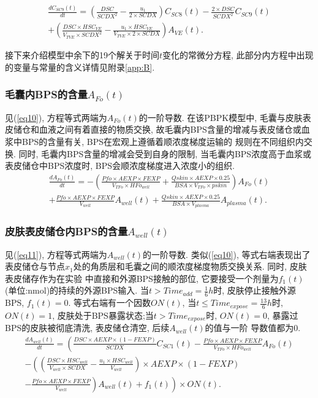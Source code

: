 \documentclass[a4paper,punct=banjiao,twoside]{ctexrep}
\theoremstyle{plain}
\theoremstyle{definition}
\theoremstyle{remark}
\begin{document}
\begin{multline}\label{eq3}
  \frac{dC_{SC9}(t)}{dt}=\left(\frac{DSC}{SCDX^2} -\frac{u_1}{2 \times  SCDX}\right)C_{SC8}(t)-\frac{2 \times DSC}{SCDX^2}  C_{SC9}(t)\\
  +\left(\frac{DSC \times  HSC_{VE}}{V_{TVE}  \times  SCDX^2 }-\frac{u_1  \times  HSC_{VE}}{V_{TVE}  \times  2 \times  SCDX}\right)A_{VE}(t) .
\end{multline}

接下来介绍模型中余下的19个解关于时间$t$变化的常微分方程, 此部分内方程中出现的变量与常量的含义详情见附录\ref{app:B}.
\subsubsection*{毛囊内BPS的含量$A_{Fo}(t)$}
见(\ref{eq10}), 方程等式两端为$A_{Fo}(t)$的一阶导数. 在该PBPK模型中, 毛囊与皮肤表皮储仓和血液之间有着直接的物质交换, 故毛囊内BPS含量的增减与表皮储仓或血浆中BPS的含量有关, BPS在宏观上遵循着顺浓度梯度运输的
规则在不同组织内交换. 同时, 毛囊内BPS含量的增减会受到自身的限制, 当毛囊内BPS浓度高于血浆或表皮储仓中BPS浓度时, BPS会顺浓度梯度进入浓度小的组织.
\begin{multline}\label{eq10}
  \frac{dA_{Fo}(t)}{dt} = -\left(\frac{Pfo \times  AEXP \times  FEXP}{V_{TFo}  \times  HFo_{well} }
  +\frac{Qskin \times  AEXP \times  0.25}{BSA \times  V_{TFo}  \times  pskin}\right)A_{Fo}(t)\\
  +\frac{Pfo \times  AEXP \times  FEXP}{V_{well}  }A_{well}(t)+\frac{Qskin \times  AEXP \times  0.25}{BSA \times  V_{plasma}} A_{plasma}(t).
\end{multline}

\subsubsection*{皮肤表皮储仓内BPS的含量$A_{well}(t)$}
见(\ref{eq11}), 方程等式两端为$A_{well}(t)$的一阶导数. 类似(\ref{eq10}), 等式右端表现出了表皮储仓与节点$x_1$处的角质层和毛囊之间的顺浓度梯度物质交换关系. 同时, 皮肤表皮储存作为在实验
中直接和外源BPS接触的部位, 它要接受一个剂量为$f_1 (t)$(单位:nmol)的持续的外源BPS输入. 当$t>Time_{add}=\frac{1}{6}h$时, 皮肤停止接触外源BPS, $f_1 (t)=0$. 
等式右端有一个因数$ON(t)$, 当$t\leq Time_{expose}=\frac{13}{6}h$时, $ON(t)=1$, 皮肤处于BPS暴露状态;当$t> Time_{expose}$时, $ON(t)=0$, 暴露过BPS的皮肤被彻底清洗, 表皮储仓清空, 后续$A_{well}(t)$的值与一阶
导数值都为0.
\begin{multline}\label{eq11}
  \frac{dA_{well}(t)}{dt} = \left(\frac{DSC \times  AEXP \times  (1-FEXP)}{SCDX} C_{SC1}(t)-\frac{Pfo \times  AEXP \times  FEXP}{V_{TFo} \times  HFo_{well}} A_{Fo}(t)\right.\\
  \left. -\left(\left(\frac{DSC \times  HSC_{well}}{V_{well} \times  SCDX}-\frac{u_1 \times  HSC_{well}}{V_{well} }\right) \times  AEXP \times  (1-FEXP) \right.\right.\\
  \left.\left.-\frac{Pfo \times  AEXP \times  FEXP}{V_{well}} \right)A_{well}(t)+f_1 (t) \right) \times  ON(t).
\end{multline}
\end{document}
